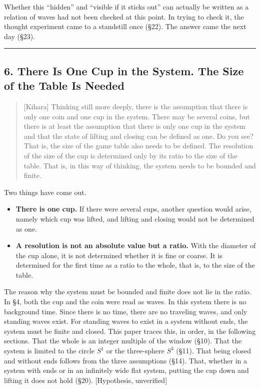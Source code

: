 \documentclass[
  a4paper,
]{article}
\providecommand{\tightlist}{%
  \setlength{\itemsep}{0pt}\setlength{\parskip}{0pt}}
\begin{document}
Whether this ``hidden'' and ``visible if it sticks out'' can actually be
written as a relation of waves had not been checked at this point. In
trying to check it, the thought experiment came to a standstill once
(§22). The answer came the next day (§23).

\begin{center}\rule{0.5\linewidth}{0.5pt}\end{center}

\subsection{6. There Is One Cup in the System. The Size of the Table Is
Needed}\label{there-is-one-cup-in-the-system.-the-size-of-the-table-is-needed}

\begin{quote}
{[}Kihara{]} Thinking still more deeply, there is the assumption that
there is only one coin and one cup in the system. There may be several
coins, but there is at least the assumption that there is only one cup
in the system and that the state of lifting and closing can be defined
as one. Do you see? That is, the size of the game table also needs to be
defined. The resolution of the size of the cup is determined only by its
ratio to the size of the table. That is, in this way of thinking, the
system needs to be bounded and finite.
\end{quote}

Two things have come out.

\begin{itemize}
\tightlist
\item
  \textbf{There is one cup.} If there were several cups, another
  question would arise, namely which cup was lifted, and lifting and
  closing would not be determined as one.
\item
  \textbf{A resolution is not an absolute value but a ratio.} With the
  diameter of the cup alone, it is not determined whether it is fine or
  coarse. It is determined for the first time as a ratio to the whole,
  that is, to the size of the table.
\end{itemize}

The reason why the system must be bounded and finite does not lie in the
ratio. In §4, both the cup and the coin were read as waves. In this
system there is no background time. Since there is no time, there are no
traveling waves, and only standing waves exist. For standing waves to
exist in a system without ends, the system must be finite and closed.
This paper traces this, in order, in the following sections. That the
whole is an integer multiple of the window (§10). That the system is
limited to the circle \(S^1\) or the three-sphere \(S^3\) (§11). That
being closed and without ends follows from the three assumptions (§14).
That, whether in a system with ends or in an infinitely wide flat
system, putting the cup down and lifting it does not hold (§20).
{[}Hypothesis, unverified{]}
\end{document}
